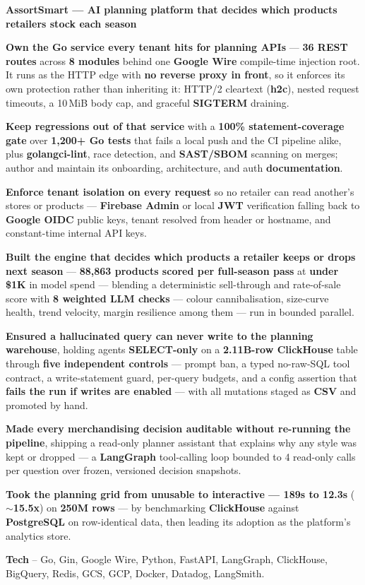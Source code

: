 \textcolor{Project}{\textbf{AssortSmart --- AI planning platform that decides which products retailers stock each season}}
\vspace{-0.6ex}
\begin{zitemize}
    \item \textbf{Own the Go service every tenant hits for planning APIs} --- \textbf{36 REST routes} across \textbf{8 modules} behind one \textbf{Google Wire} compile-time injection root. It runs as the HTTP edge with \textbf{no reverse proxy in front}, so it enforces its own protection rather than inheriting it: HTTP/2 cleartext (\textbf{h2c}), nested request timeouts, a 10\,MiB body cap, and graceful \textbf{SIGTERM} draining.
    \item \textbf{Keep regressions out of that service} with a \textbf{100\% statement-coverage gate} over \textbf{1,200+ Go tests} that fails a local push and the CI pipeline alike, plus \textbf{golangci-lint}, race detection, and \textbf{SAST/SBOM} scanning on merges; author and maintain its onboarding, architecture, and auth \textbf{documentation}.
    \item \textbf{Enforce tenant isolation on every request} so no retailer can read another's stores or products --- \textbf{Firebase Admin} or local \textbf{JWT} verification falling back to \textbf{Google OIDC} public keys, tenant resolved from header or hostname, and constant-time internal API keys.
    \item \textbf{Built the engine that decides which products a retailer keeps or drops next season} --- \textbf{88,863 products scored per full-season pass} at \textbf{under \$1K} in model spend --- blending a deterministic sell-through and rate-of-sale score with \textbf{8 weighted LLM checks} --- colour cannibalisation, size-curve health, trend velocity, margin resilience among them --- run in bounded parallel.
    \item \textbf{Ensured a hallucinated query can never write to the planning warehouse}, holding agents \textbf{SELECT-only} on a \textbf{2.11B-row ClickHouse} table through \textbf{five independent controls} --- prompt ban, a typed no-raw-SQL tool contract, a write-statement guard, per-query budgets, and a config assertion that \textbf{fails the run if writes are enabled} --- with all mutations staged as \textbf{CSV} and promoted by hand.
    \item \textbf{Made every merchandising decision auditable without re-running the pipeline}, shipping a read-only planner assistant that explains why any style was kept or dropped --- a \textbf{LangGraph} tool-calling loop bounded to 4 read-only calls per question over frozen, versioned decision snapshots.
    \item \textbf{Took the planning grid from unusable to interactive --- 189s to 12.3s} ($\sim$\textbf{15.5x}) on \textbf{250M rows} --- by benchmarking \textbf{ClickHouse} against \textbf{PostgreSQL} on row-identical data, then leading its adoption as the platform's analytics store.
    \item \textbf{Tech} -- Go, Gin, Google Wire, Python, FastAPI, LangGraph, ClickHouse, BigQuery, Redis, GCS, GCP, Docker, Datadog, LangSmith.
\end{zitemize}

